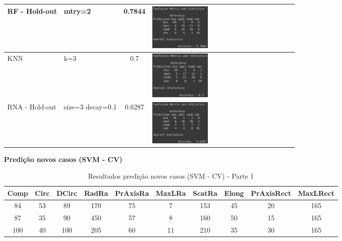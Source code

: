\begin{longtable}{|>{\centering\arraybackslash}p{2.5cm}|>{\centering\arraybackslash}m{2.5cm}|c|m{7cm}|}
\hline
RF - Hold-out    & mtry=2 & 0.7844 & \includegraphics[width=0.4\textwidth]{apendices/fig/8_IAA008_5.png} \\
\hline
KNN    & k=3 & 0.7 & \includegraphics[width=0.4\textwidth]{apendices/fig/8_IAA008_6.png} \\
\hline
RNA - Hold-out    & size=3 decay=0.1 & 0.6287 & \includegraphics[width=0.4\textwidth]{apendices/fig/8_IAA008_7.png} \\
\hline
\end{longtable}


\begin{center}
    \textbf{Predição novos casos (SVM - CV)}
\end{center}

\begin{table}[H]
\caption{Resultados predição novos casos (SVM - CV) - Parte 1}
\hspace*{-1.5cm} %
\begin{minipage}{\textwidth}
\centering
\begin{tabular}{|c|c|c|c|c|c|c|c|c|c|}
\hline
Comp & Circ & DCirc & RadRa & PrAxisRa & MaxLRa & ScatRa & Elong & PrAxisRect & MaxLRect \\
\hline
84   & 53   & 89    & 170   & 75       & 7      & 153    & 45    & 20         & 165 \\
\hline
87   & 35   & 90    & 450   & 57       & 8      & 160    & 50    & 15         & 165 \\
\hline
100  & 40   & 100   & 205   & 60       & 11     & 210    & 35    & 30         & 165 \\
\hline
\end{tabular}
\end{minipage}
\end{table}


